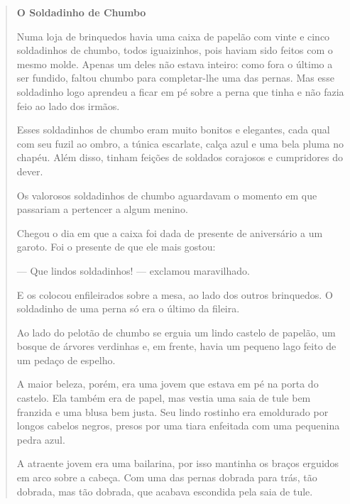 \begin{quote}
\textbf{O Soldadinho de Chumbo}



Numa loja de brinquedos havia uma caixa de papelão com vinte e cinco
soldadinhos de chumbo, todos iguaizinhos, pois haviam sido feitos com o
mesmo molde. Apenas um deles não estava inteiro: como fora o último a ser
fundido, faltou chumbo para completar-lhe uma das pernas. Mas esse soldadinho
logo aprendeu a ficar em pé sobre a perna que tinha e não fazia feio
ao lado dos irmãos.

Esses soldadinhos de chumbo eram muito bonitos e elegantes, cada qual
com seu fuzil ao ombro, a túnica escarlate, calça azul e uma bela pluma
no chapéu. Além disso, tinham feições de soldados corajosos e
cumpridores do dever.

Os valorosos soldadinhos de chumbo aguardavam o momento em que passariam
a pertencer a algum menino.

Chegou o dia em que a caixa foi dada de presente de aniversário a um
garoto. Foi o presente de que ele mais gostou:

--- Que lindos soldadinhos! --- exclamou maravilhado.

E os colocou enfileirados sobre a mesa, ao lado dos outros brinquedos. O
soldadinho de uma perna só era o último da fileira.

Ao lado do pelotão de chumbo se erguia um lindo castelo de papelão, um
bosque de árvores verdinhas e, em frente, havia um pequeno lago feito de
um pedaço de espelho.

A maior beleza, porém, era uma jovem que estava em pé na porta do
castelo. Ela também era de papel, mas vestia uma saia de tule bem
franzida e uma blusa bem justa. Seu lindo rostinho era emoldurado por
longos cabelos negros, presos por uma tiara enfeitada com uma pequenina
pedra azul.

A atraente jovem era uma bailarina, por isso mantinha os braços erguidos
em arco sobre a cabeça. Com uma das pernas dobrada para trás, tão
dobrada, mas tão dobrada, que acabava escondida pela saia de tule.


\end{quote}
